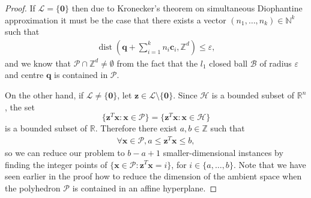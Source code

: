 \begin{proof}
If $\mathcal{L} = \lbrace \boldsymbol{0} \rbrace$ then due to Kronecker's theorem on simultaneous Diophantine approximation it must be the case that there exists a vector $(n_{1}, \ldots, n_{k}) \in \mathbb{N}^{k}$ such that
\begin{align*}
\operatorname{dist} \left(\boldsymbol{q} + \sum\limits_{i=1}^{k} n_{i} \boldsymbol{c}_{i}, \mathbb{Z}^{d} \right) \leq \varepsilon ,
\end{align*}
and we know that $\mathcal{P} \cap \mathbb{Z}^{d} \neq \emptyset$ from the fact that the $l_{1}$ closed ball $\mathcal{B}$ of radius $\varepsilon$ and centre $\boldsymbol{q}$ is contained in $\mathcal{P}$.

On the other hand, if
$\mathcal{L} \neq \lbrace \boldsymbol{0} \rbrace$, let
$\boldsymbol{z} \in \mathcal{L} \setminus \lbrace \boldsymbol{0}
\rbrace$.
Since $\mathcal{H}$ is a bounded subset of $\mathbb{R}^n$, the set
\[ \{ \boldsymbol{z}^T\boldsymbol{x} : \boldsymbol{x}\in \mathcal{P} \} =
   \{ \boldsymbol{z}^T\boldsymbol{x} : \boldsymbol{x}\in \mathcal{H} \} \]
is a bounded subset of $\mathbb{R}$.
Therefore there exist
$a,b \in \mathbb{Z}$ such that
\begin{align*}
\forall \boldsymbol{x} \in \mathcal{P}, a \leq \boldsymbol{z}^{T} \boldsymbol{x} \leq b ,
\end{align*}
so we can reduce our problem to $b-a+1$ smaller-dimensional instances
by finding the integer points of
$\lbrace \boldsymbol{x} \in \mathcal{P} :
\boldsymbol{z}^{T} \boldsymbol{x} = i \rbrace$,
for $i \in \lbrace a, \ldots, b \rbrace$. Note that we have seen
earlier in the proof how to reduce the dimension of the ambient space
when the polyhedron $\mathcal{P}$ is contained in an affine
hyperplane.
\end{proof}

